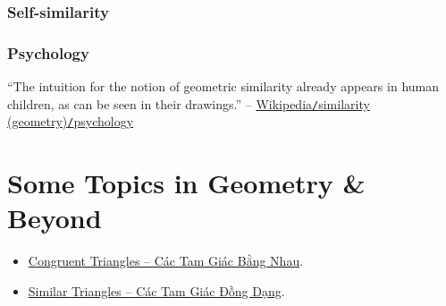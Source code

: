 \documentclass{article}
\begin{document}
\subsubsection{Self-similarity}

\subsubsection{Psychology}
``The intuition for the notion of geometric similarity already appears in human children, as can be seen in their drawings.'' -- \href{https://en.wikipedia.org/wiki/Similarity_(geometry)#Psychology}{Wikipedia\texttt{/}similarity (geometry)\texttt{/}psychology}


\section{Some Topics in Geometry \& Beyond}

\begin{itemize}
	\item \href{https://github.com/NQBH/hobby/blob/master/elementary_mathematics/grade_7/congruent_triangle/NQBH_congruent_triangle.pdf}{Congruent Triangles -- Các Tam Giác Bằng Nhau}.
	\item \href{https://github.com/NQBH/hobby/blob/master/elementary_mathematics/grade_8/similar_triangle/NQBH_similar_triangle.pdf}{Similar Triangles -- Các Tam Giác Đồng Dạng}.
\end{itemize}


\printbibliography[heading=bibintoc]
	
\end{document}
